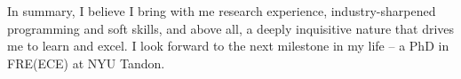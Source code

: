 \documentclass[12pt, a4paper]{article}
\begin{document}
In summary, I believe I bring with me research experience, industry-sharpened programming and soft skills, and above all, a deeply inquisitive nature that drives me to learn and excel. I look forward to the next milestone in my life – a PhD in FRE(ECE) at NYU Tandon.







\end{document}
